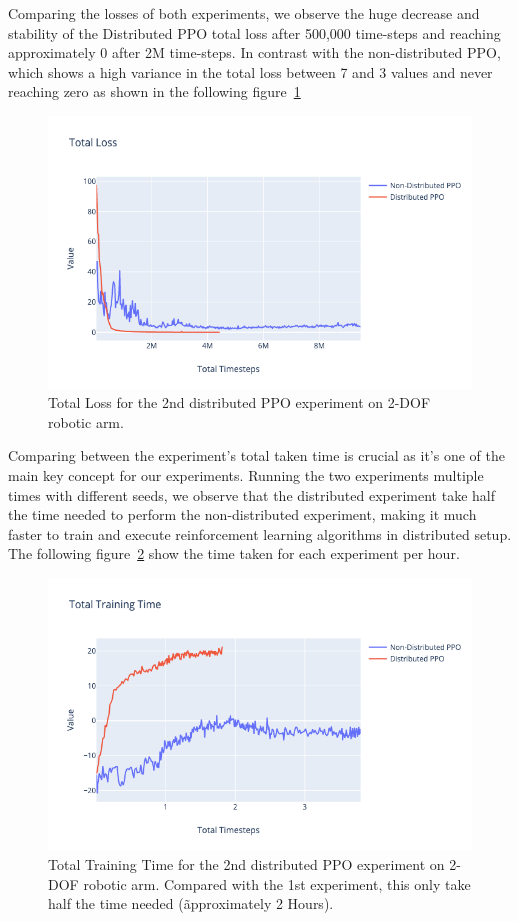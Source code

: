 Comparing the losses of both experiments, we observe the huge decrease and stability of the Distributed PPO total loss after 500,000 time-steps and reaching approximately 0 after 2M time-steps. In contrast with the non-distributed PPO, which shows a high variance in the total loss between 7 and 3 values and never reaching zero as shown in the following figure~\ref{fig:2nd_exp_total_loss}
\begin{figure}[H] %
		\centering
		\includegraphics[width=1.2\linewidth]{figures/exps/2nd_exp/total_loss.png}
		\caption{Total Loss for the 2nd distributed PPO experiment on 2-DOF robotic arm.}
		\label{fig:2nd_exp_total_loss}
\end{figure}

Comparing between the experiment's total taken time is crucial as it's one of the main key concept for our experiments. Running the two experiments multiple times with different seeds, we observe that the distributed experiment take half the time needed to perform the non-distributed experiment, making it much faster to train and execute reinforcement learning algorithms in distributed setup. The following figure~\ref{fig:2nd_exp_total_training_time} show the time taken for each experiment per hour.
\begin{figure}[H] %
		\centering
		\includegraphics[width=1.2\linewidth]{figures/exps/2nd_exp/total_training_time.png}
		\caption{Total Training Time for the 2nd distributed PPO experiment on 2-DOF robotic arm. Compared with the 1st experiment, this only take half the time needed (\~approximately 2 Hours).}
		\label{fig:2nd_exp_total_training_time}
\end{figure}


